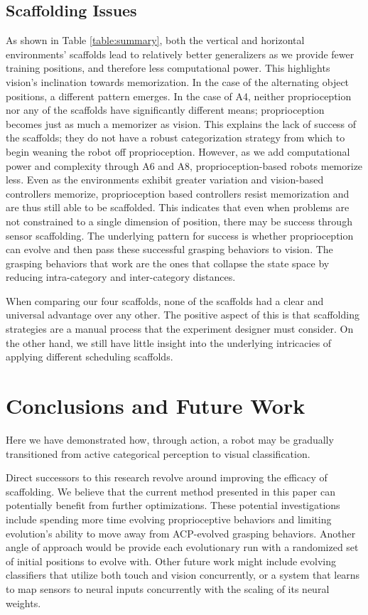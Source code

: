 \documentclass{sig-alternate}
\begin{document}
\subsection {Scaffolding Issues}

As shown in Table \ref{table:summary}, both the vertical and horizontal environments' scaffolds lead to relatively better generalizers as we provide fewer training positions, and therefore less computational power. This highlights vision's inclination towards memorization. In the case of the alternating object positions, a different pattern emerges. In the case of A4, neither proprioception nor any of the scaffolds have significantly different means; proprioception becomes just as much a memorizer as vision. This explains the lack of success of the scaffolds; they do not have a robust categorization strategy from which to begin weaning the robot off proprioception. However, as we add computational power and complexity through A6 and A8, proprioception-based robots memorize less. Even as the environments exhibit greater variation and vision-based controllers memorize, proprioception based controllers resist memorization and are thus still able to be scaffolded. This indicates that even when problems are not constrained to a single dimension of position, there may be success through sensor scaffolding. The underlying pattern for success is whether proprioception can evolve and then pass these successful grasping behaviors to vision. The grasping behaviors that work are the ones that collapse the state space by reducing intra-category and inter-category distances. 

When comparing our four scaffolds, none of the scaffolds had a clear and universal advantage over any other. The positive aspect of this is that scaffolding strategies are a manual process that the experiment designer must consider. On the other hand, we still have little insight into the underlying intricacies of applying different scheduling scaffolds. 

\section{Conclusions and Future Work}
\label{sectConclusions}

Here we have demonstrated how, through action, a robot may be gradually
transitioned from active categorical perception to visual classification.

Direct successors to this research revolve around improving the efficacy of scaffolding. 
We believe that the current method presented in this paper can potentially benefit from further optimizations. These potential investigations include spending more time evolving proprioceptive behaviors and limiting evolution's ability to move away from ACP-evolved grasping behaviors. Another angle of approach would be provide each evolutionary run with a randomized set of initial positions to evolve with. Other future work might include evolving classifiers that utilize both touch and vision concurrently, or a system that learns to map sensors to neural inputs concurrently with the scaling of its neural weights. 
\end{document}
